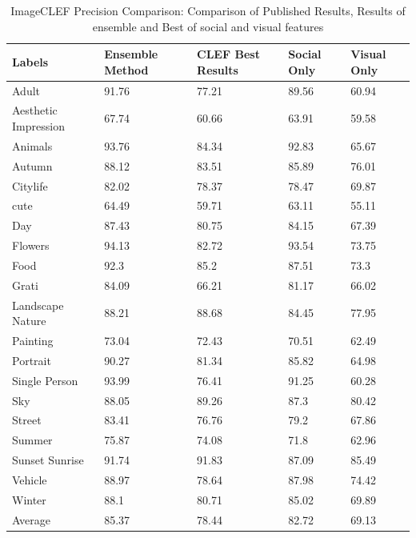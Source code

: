 \begin{table}
\centering
\caption{ ImageCLEF Precision Comparison: Comparison of Published Results, Results of ensemble and Best of social and visual features} %
\vspace*{0.2 cm}
\begin{tabular}{| p{1.7cm}| p{1.5cm}|p{1.2cm}|p{1.2cm}|p{1.2cm}|} \hline
 Labels & Ensemble Method & CLEF Best Results & Social Only & Visual Only  \\  [1ex] \hline
Adult & 91.76 & 77.21 & 89.56 & 60.94  \\  [1ex] \hline
Aesthetic Impression & 67.74 & 60.66 & 63.91 & 59.58  \\  [1ex] \hline
Animals & 93.76 & 84.34 & 92.83 & 65.67  \\  [1ex] \hline
Autumn & 88.12 & 83.51 & 85.89 & 76.01  \\  [1ex] \hline
Citylife & 82.02 & 78.37 & 78.47 & 69.87  \\  [1ex] \hline
cute & 64.49 & 59.71 & 63.11 & 55.11  \\  [1ex] \hline
Day & 87.43 & 80.75 & 84.15 & 67.39  \\  [1ex] \hline
Flowers & 94.13 & 82.72 & 93.54 & 73.75  \\  [1ex] \hline
Food & 92.3 & 85.2 & 87.51 & 73.3  \\  [1ex] \hline
Grati & 84.09 & 66.21 & 81.17 & 66.02  \\  [1ex] \hline
Landscape Nature & 88.21 & 88.68 & 84.45 & 77.95  \\  [1ex] \hline
Painting & 73.04 & 72.43 & 70.51 & 62.49  \\  [1ex] \hline
Portrait & 90.27 & 81.34 & 85.82 & 64.98  \\  [1ex] \hline
Single Person & 93.99 & 76.41 & 91.25 & 60.28  \\  [1ex] \hline
Sky & 88.05 & 89.26 & 87.3 & 80.42  \\  [1ex] \hline
Street & 83.41 & 76.76 & 79.2 & 67.86  \\  [1ex] \hline
Summer & 75.87 & 74.08 & 71.8 & 62.96  \\  [1ex] \hline
Sunset Sunrise & 91.74 & 91.83 & 87.09 & 85.49  \\  [1ex] \hline
Vehicle & 88.97 & 78.64 & 87.98 & 74.42  \\  [1ex] \hline
Winter & 88.1 & 80.71 & 85.02 & 69.89  \\  [1ex] \hline
Average & 85.37 & 78.44 & 82.72 & 69.13  \\  [1ex] \hline
\end{tabular}
 \label{ImageCLEFPrecisionOverAll} %
\end{table}

